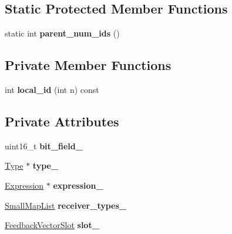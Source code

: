 \subsection*{Static Protected Member Functions}
\begin{DoxyCompactItemize}
\item 
static int {\bfseries parent\+\_\+num\+\_\+ids} ()\hypertarget{classv8_1_1internal_1_1_count_operation_a68f48cd4e0758f2e1d3d87e0a2e21232}{}\label{classv8_1_1internal_1_1_count_operation_a68f48cd4e0758f2e1d3d87e0a2e21232}

\end{DoxyCompactItemize}
\subsection*{Private Member Functions}
\begin{DoxyCompactItemize}
\item 
int {\bfseries local\+\_\+id} (int n) const \hypertarget{classv8_1_1internal_1_1_count_operation_a1277949bf6b70c91684cf78b1c4d34c6}{}\label{classv8_1_1internal_1_1_count_operation_a1277949bf6b70c91684cf78b1c4d34c6}

\end{DoxyCompactItemize}
\subsection*{Private Attributes}
\begin{DoxyCompactItemize}
\item 
uint16\+\_\+t {\bfseries bit\+\_\+field\+\_\+}\hypertarget{classv8_1_1internal_1_1_count_operation_a242c356f826ebfe10176f3bfa2cb89d7}{}\label{classv8_1_1internal_1_1_count_operation_a242c356f826ebfe10176f3bfa2cb89d7}

\item 
\hyperlink{classv8_1_1internal_1_1_type}{Type} $\ast$ {\bfseries type\+\_\+}\hypertarget{classv8_1_1internal_1_1_count_operation_ab8bdcb40085cfdb9190ca6a7e1f19362}{}\label{classv8_1_1internal_1_1_count_operation_ab8bdcb40085cfdb9190ca6a7e1f19362}

\item 
\hyperlink{classv8_1_1internal_1_1_expression}{Expression} $\ast$ {\bfseries expression\+\_\+}\hypertarget{classv8_1_1internal_1_1_count_operation_a1b070bcb50e18a0171a7810ea6abd344}{}\label{classv8_1_1internal_1_1_count_operation_a1b070bcb50e18a0171a7810ea6abd344}

\item 
\hyperlink{classv8_1_1internal_1_1_small_map_list}{Small\+Map\+List} {\bfseries receiver\+\_\+types\+\_\+}\hypertarget{classv8_1_1internal_1_1_count_operation_a09e05c067e7179e644006fab13ed3118}{}\label{classv8_1_1internal_1_1_count_operation_a09e05c067e7179e644006fab13ed3118}

\item 
\hyperlink{classv8_1_1internal_1_1_feedback_vector_slot}{Feedback\+Vector\+Slot} {\bfseries slot\+\_\+}\hypertarget{classv8_1_1internal_1_1_count_operation_ad63463727aa32e8bffdbf0db3101a59c}{}\label{classv8_1_1internal_1_1_count_operation_ad63463727aa32e8bffdbf0db3101a59c}

\end{DoxyCompactItemize}
